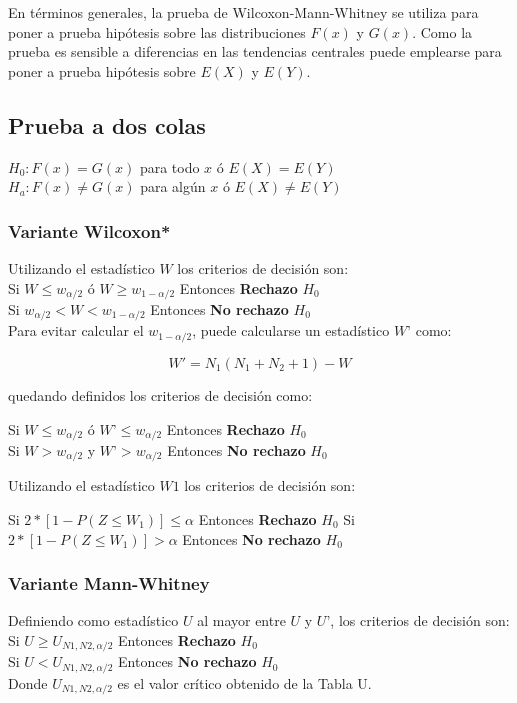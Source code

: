\documentclass[]{book}
\theoremstyle{definition}
\theoremstyle{definition}
\theoremstyle{definition}
\theoremstyle{remark}
\begin{document}
En términos generales, la prueba de Wilcoxon-Mann-Whitney se utiliza
para poner a prueba hipótesis sobre las distribuciones \(F(x)\) y
\(G(x)\). Como la prueba es sensible a diferencias en las tendencias
centrales puede emplearse para poner a prueba hipótesis sobre \(E(X)\) y
\(E(Y)\).

\hypertarget{prueba-a-dos-colas}{%
\subsection{Prueba a dos colas}\label{prueba-a-dos-colas}}

\(H_0: F(x)=G(x)\) para todo \(x\) ó \(E(X)=E(Y)\)\\
\(H_a: F(x)≠G(x)\) para algún \(x\) ó \(E(X)≠E(Y)\)

\hypertarget{variante-wilcoxon}{%
\subsubsection{Variante Wilcoxon*}\label{variante-wilcoxon}}

Utilizando el estadístico \(W\) los criterios de decisión son:\\
Si \(W\le w_{\alpha/2}\) ó \(W\ge w_{1-\alpha/2}\) Entonces
\textbf{Rechazo} \(H_0\)\\
Si \(w_{\alpha/2}<W<w_{1-\alpha/2}\) Entonces \textbf{No rechazo}
\(H_0\)\\
Para evitar calcular el \(w_{1-\alpha/2}\), puede calcularse un
estadístico \(W’\) como:

\[W'=N_1 (N_1+N_2+1)-W\]

quedando definidos los criterios de decisión como:

Si \(W\le w_{\alpha/2}\) ó \(W’\le w_{\alpha/2}\) Entonces
\textbf{Rechazo} \(H_0\)\\
Si \(W>w_{\alpha/2}\) y \(W’>w_{\alpha/2}\) Entonces \textbf{No rechazo}
\(H_0\)

Utilizando el estadístico \(W1\) los criterios de decisión son:

Si \(2*[1-P(Z≤ W_1 )]\le \alpha\) Entonces \textbf{Rechazo} \(H_0\) Si
\(2*[1-P(Z≤ W_1 )]>\alpha\) Entonces \textbf{No rechazo} \(H_0\)

\hypertarget{variante-mann-whitney}{%
\subsubsection{Variante Mann-Whitney}\label{variante-mann-whitney}}

Definiendo como estadístico \(U\) al mayor entre \(U\) y \(U’\), los
criterios de decisión son:\\
Si \(U≥U_{N1,N2,\alpha/2}\) Entonces \textbf{Rechazo} \(H_0\)\\
Si \(U<U_{N1,N2,\alpha/2}\) Entonces \textbf{No rechazo} \(H_0\)\\
Donde \(U_{N1,N2,\alpha/2}\) es el valor crítico obtenido de la Tabla U.
\end{document}
